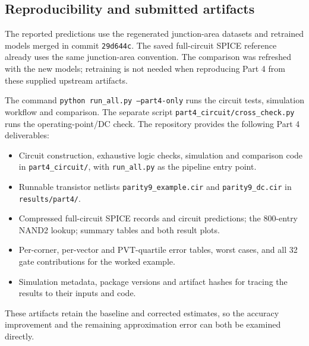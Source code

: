 \subsection{Reproducibility and submitted artifacts}
The reported predictions use the regenerated junction-area datasets and
retrained models merged in commit \texttt{29d644c}. The saved full-circuit
SPICE reference already uses the same junction-area convention. The
comparison was refreshed with the new models; retraining is not needed
when reproducing Part 4 from these supplied upstream artifacts.

The command \texttt{python run\_all.py --part4-only} runs the circuit tests,
simulation workflow and comparison. The separate script
\texttt{part4\_circuit/cross\_check.py} runs the operating-point/DC check.
The repository provides the following Part 4 deliverables:
\begin{itemize}
\item Circuit construction, exhaustive logic checks, simulation and
comparison code in \texttt{part4\_circuit/}, with \texttt{run\_all.py}
as the pipeline entry point.
\item Runnable transistor netlists \texttt{parity9\_example.cir} and
\texttt{parity9\_dc.cir} in \texttt{results/part4/}.
\item Compressed full-circuit SPICE records and circuit predictions;
the 800-entry NAND2 lookup; summary tables and both result plots.
\item Per-corner, per-vector and PVT-quartile error tables, worst cases,
and all 32 gate contributions for the worked example.
\item Simulation metadata, package versions and artifact hashes for
tracing the results to their inputs and code.
\end{itemize}
These artifacts retain the baseline and corrected estimates, so the
accuracy improvement and the remaining approximation error can both be
examined directly.
